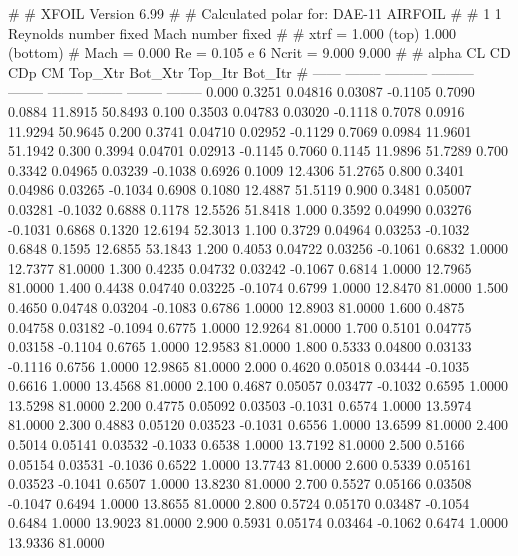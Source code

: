 #  
#       XFOIL         Version 6.99
#  
# Calculated polar for: DAE-11 AIRFOIL                                  
#  
# 1 1 Reynolds number fixed          Mach number fixed         
#  
# xtrf =   1.000 (top)        1.000 (bottom)  
# Mach =   0.000     Re =     0.105 e 6     Ncrit =   9.000  9.000
#  
#   alpha    CL        CD       CDp       CM     Top_Xtr  Bot_Xtr  Top_Itr  Bot_Itr
#  ------ -------- --------- --------- -------- -------- -------- -------- --------
   0.000   0.3251   0.04816   0.03087  -0.1105   0.7090   0.0884  11.8915  50.8493
   0.100   0.3503   0.04783   0.03020  -0.1118   0.7078   0.0916  11.9294  50.9645
   0.200   0.3741   0.04710   0.02952  -0.1129   0.7069   0.0984  11.9601  51.1942
   0.300   0.3994   0.04701   0.02913  -0.1145   0.7060   0.1145  11.9896  51.7289
   0.700   0.3342   0.04965   0.03239  -0.1038   0.6926   0.1009  12.4306  51.2765
   0.800   0.3401   0.04986   0.03265  -0.1034   0.6908   0.1080  12.4887  51.5119
   0.900   0.3481   0.05007   0.03281  -0.1032   0.6888   0.1178  12.5526  51.8418
   1.000   0.3592   0.04990   0.03276  -0.1031   0.6868   0.1320  12.6194  52.3013
   1.100   0.3729   0.04964   0.03253  -0.1032   0.6848   0.1595  12.6855  53.1843
   1.200   0.4053   0.04722   0.03256  -0.1061   0.6832   1.0000  12.7377  81.0000
   1.300   0.4235   0.04732   0.03242  -0.1067   0.6814   1.0000  12.7965  81.0000
   1.400   0.4438   0.04740   0.03225  -0.1074   0.6799   1.0000  12.8470  81.0000
   1.500   0.4650   0.04748   0.03204  -0.1083   0.6786   1.0000  12.8903  81.0000
   1.600   0.4875   0.04758   0.03182  -0.1094   0.6775   1.0000  12.9264  81.0000
   1.700   0.5101   0.04775   0.03158  -0.1104   0.6765   1.0000  12.9583  81.0000
   1.800   0.5333   0.04800   0.03133  -0.1116   0.6756   1.0000  12.9865  81.0000
   2.000   0.4620   0.05018   0.03444  -0.1035   0.6616   1.0000  13.4568  81.0000
   2.100   0.4687   0.05057   0.03477  -0.1032   0.6595   1.0000  13.5298  81.0000
   2.200   0.4775   0.05092   0.03503  -0.1031   0.6574   1.0000  13.5974  81.0000
   2.300   0.4883   0.05120   0.03523  -0.1031   0.6556   1.0000  13.6599  81.0000
   2.400   0.5014   0.05141   0.03532  -0.1033   0.6538   1.0000  13.7192  81.0000
   2.500   0.5166   0.05154   0.03531  -0.1036   0.6522   1.0000  13.7743  81.0000
   2.600   0.5339   0.05161   0.03523  -0.1041   0.6507   1.0000  13.8230  81.0000
   2.700   0.5527   0.05166   0.03508  -0.1047   0.6494   1.0000  13.8655  81.0000
   2.800   0.5724   0.05170   0.03487  -0.1054   0.6484   1.0000  13.9023  81.0000
   2.900   0.5931   0.05174   0.03464  -0.1062   0.6474   1.0000  13.9336  81.0000
